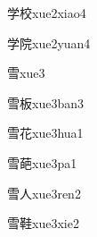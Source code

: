 \begin{verbete}[8;10]{学校}{xue2xiao4}
\end{verbete}

\begin{verbete}[8;9]{学院}{xue2yuan4}
\end{verbete}

\begin{verbete}[11]{雪}{xue3}
\end{verbete}

\begin{verbete}[11;8]{雪板}{xue3ban3}
\end{verbete}

\begin{verbete}[11;7]{雪花}{xue3hua1}
\end{verbete}

\begin{verbete}[11;12]{雪葩}{xue3pa1}
\end{verbete}

\begin{verbete}[11;2]{雪人}{xue3ren2}
\end{verbete}

\begin{verbete}[11;15]{雪鞋}{xue3xie2}
\end{verbete}


